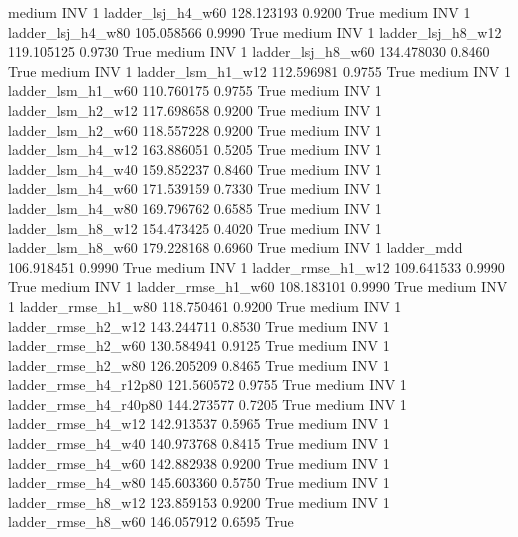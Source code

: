     medium      INV                 1      ladder_lsj_h4_w60 128.123193      0.9200    True
    medium      INV                 1      ladder_lsj_h4_w80 105.058566      0.9990    True
    medium      INV                 1      ladder_lsj_h8_w12 119.105125      0.9730    True
    medium      INV                 1      ladder_lsj_h8_w60 134.478030      0.8460    True
    medium      INV                 1      ladder_lsm_h1_w12 112.596981      0.9755    True
    medium      INV                 1      ladder_lsm_h1_w60 110.760175      0.9755    True
    medium      INV                 1      ladder_lsm_h2_w12 117.698658      0.9200    True
    medium      INV                 1      ladder_lsm_h2_w60 118.557228      0.9200    True
    medium      INV                 1      ladder_lsm_h4_w12 163.886051      0.5205    True
    medium      INV                 1      ladder_lsm_h4_w40 159.852237      0.8460    True
    medium      INV                 1      ladder_lsm_h4_w60 171.539159      0.7330    True
    medium      INV                 1      ladder_lsm_h4_w80 169.796762      0.6585    True
    medium      INV                 1      ladder_lsm_h8_w12 154.473425      0.4020    True
    medium      INV                 1      ladder_lsm_h8_w60 179.228168      0.6960    True
    medium      INV                 1             ladder_mdd 106.918451      0.9990    True
    medium      INV                 1     ladder_rmse_h1_w12 109.641533      0.9990    True
    medium      INV                 1     ladder_rmse_h1_w60 108.183101      0.9990    True
    medium      INV                 1     ladder_rmse_h1_w80 118.750461      0.9200    True
    medium      INV                 1     ladder_rmse_h2_w12 143.244711      0.8530    True
    medium      INV                 1     ladder_rmse_h2_w60 130.584941      0.9125    True
    medium      INV                 1     ladder_rmse_h2_w80 126.205209      0.8465    True
    medium      INV                 1  ladder_rmse_h4_r12p80 121.560572      0.9755    True
    medium      INV                 1  ladder_rmse_h4_r40p80 144.273577      0.7205    True
    medium      INV                 1     ladder_rmse_h4_w12 142.913537      0.5965    True
    medium      INV                 1     ladder_rmse_h4_w40 140.973768      0.8415    True
    medium      INV                 1     ladder_rmse_h4_w60 142.882938      0.9200    True
    medium      INV                 1     ladder_rmse_h4_w80 145.603360      0.5750    True
    medium      INV                 1     ladder_rmse_h8_w12 123.859153      0.9200    True
    medium      INV                 1     ladder_rmse_h8_w60 146.057912      0.6595    True
